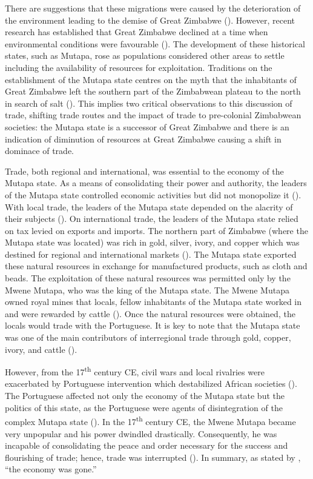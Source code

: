 There are suggestions that these migrations were caused by the deterioration of the environment leading to the demise of Great Zimbabwe (\cite[][]{huffman1972}). However, recent research has established that Great Zimbabwe declined at a time when environmental conditions were favourable (\cites[][]{pikirayi2001}[][]{pikirayi2006}[][]{pikirayi2017}[][]{chirikure2017}). The development of these historical states, such as Mutapa, rose as populations considered other areas to settle including the availability of resources for exploitation. Traditions on the establishment of the Mutapa state centres on the myth that the inhabitants of Great Zimbabwe left the southern part of the Zimbabwean plateau to the north in search of salt (\cite[][]{ab1961}). This implies two critical observations to this discussion of trade, shifting trade routes and the impact of trade to pre-colonial Zimbabwean societies: the Mutapa state is a successor of Great Zimbabwe and there is an indication of diminution of resources at Great Zimbabwe causing a shift in dominace of trade.

Trade, both regional and international, was essential to the economy of the Mutapa state. As a means of consolidating their power and authority, the leaders of the Mutapa state controlled economic activities but did not monopolize it (\cites[][]{mudenge1974}[][]{mudenge1988}). With local trade, the leaders of the Mutapa state depended on the alacrity of their subjects (\cite[][]{chanaiwa1972}). On international trade, the leaders of the Mutapa state relied on tax levied on exports and imports. The northern part of Zimbabwe (where the Mutapa state was located) was rich in gold, silver, ivory, and copper which was destined for regional and international markets (\cite[][]{chanaiwa1972}). The Mutapa state exported these natural resources in exchange for manufactured products, such as cloth and beads. The exploitation of these natural resources was permitted only by the Mwene Mutapa, who was the king of the Mutapa state. The Mwene Mutapa owned royal mines that locals, fellow inhabitants of the Mutapa state worked in and were rewarded by cattle (\cite[][]{chanaiwa1972}). Once the natural resources were obtained, the locals would trade with the Portuguese. It is key to note that the Mutapa state was one of the main contributors of interregional trade through gold, copper, ivory, and cattle (\cite[][126]{kusimba1999}).

However, from the 17\textsuperscript{th} century CE, civil wars and local rivalries were exacerbated by Portuguese intervention which destabilized African societies (\cites[][]{chanaiwa1972}[][]{alradi1990}[][]{kinahan2000}). The Portuguese affected not only the economy of the Mutapa state but the politics of this state, as the Portuguese were agents of disintegration of the complex Mutapa state (\cite[][435]{chanaiwa1972}). In the 17\textsuperscript{th} century CE, the Mwene Mutapa became very unpopular and his power dwindled drastically. Consequently, he was incapable of consolidating the peace and order necessary for the success and flourishing of trade; hence, trade was interrupted (\cite[][]{chanaiwa1972}). In summary, as stated by \textcite[][435]{chanaiwa1972}, “the economy was gone.”

